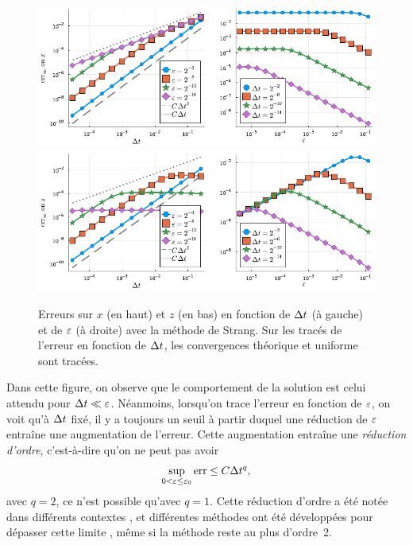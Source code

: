 \begin{figure}
    \centering
    \includegraphics[width=\textwidth]{./Presentation/strang_err_x.pdf}
    \includegraphics[width=\textwidth]{./Presentation/strang_err_z.pdf}
    \caption{Erreurs sur $x$ (en haut) et $z$ (en bas) en fonction de $\Delta t$ (à gauche) et de $\varepsilon$ (à droite) avec la méthode de Strang. Sur les tracés de l'erreur en fonction de $\Delta t$, les convergences théorique et uniforme sont tracées.}
    \label{sec:intro:fig:strang}
\end{figure}

Dans cette figure, on observe que le comportement de la solution est celui attendu pour $\Delta t \ll \varepsilon$. Néanmoins, lorsqu'on trace l'erreur en fonction de $\varepsilon$, on voit qu'à $\Delta t$ fixé, il y a toujours un seuil à partir duquel une réduction de $\varepsilon$ entraîne une augmentation de l'erreur. Cette augmentation entraîne une \textit{réduction d'ordre}, c'est-à-dire qu'on ne peut pas avoir
\begin{equation*}
    \sup_{0 < \varepsilon \leq \varepsilon_0} \operatorname{err} \leq C \Delta t^q ,
\end{equation*}
avec $q = 2$, ce n'est possible qu'avec $q = 1$. Cette réduction d'ordre a été notée dans différents contextes \cite{sportisse.2000.analysis,faou.2015.analysis}, et différentes méthodes ont été développées pour dépasser cette limite \cite{einkemmer.2015.overcoming,cano.2017.avoiding,bertoli.2020.strang}, même si la méthode reste au plus d'ordre~2.

